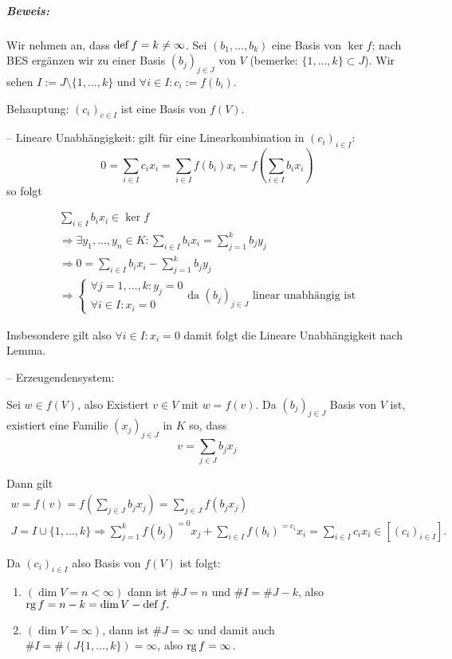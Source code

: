 \subparagraph{Beweis: }
	Wir nehmen an, dass $ \operatorname{def} f = k \neq \infty $.
	Sei $ (b_1,...,b_k) $ eine Basis von $ \ker f $;
	nach BES ergänzen wir zu einer Basis $ (b_j)_{j\in J} $ von $ V $ (bemerke: $ \{1,...,k\}\subset J $).
	Wir sehen $ I:= J\setminus \{1,...,k\} $ und $ \forall i\in I: c_i := f(b_i) $.
	
	Behauptung: $(c_i)_{c\in I}$ ist eine Basis von $f(V)$.
	
	-- Lineare Unabhängigkeit: gilt für eine Linearkombination in $(c_i)_{i\in I}$:
	\begin{equation*}
		0=\sum_{i\in I}c_ix_i = \sum_{i\in I}f(b_i)x_i = f(\sum_{i\in I}b_ix_i)
	\end{equation*}
	so folgt
	
	\begin{gather*}
		\sum_{i\in I}b_ix_i \in \ker f\\
		\Rightarrow \exists y_1,...,y_n\in K:\sum_{i\in I}b_ix_i=\sum_{j=1}^{k}b_jy_j\\
		\Rightarrow 0 = \sum_{i\in I}b_ix_i - \sum_{j=1}^{k}b_jy_j\\
		\Rightarrow
		\begin{cases}
			\forall j = 1, ... ,k:y_j=0\\
			\forall i\in I: x_i = 0
		\end{cases}
		\text{da $(b_j)_{j\in J}$ linear unabhängig ist}
	\end{gather*}
			
	Insbesondere gilt also $\forall i\in I: x_i = 0$ damit folgt die Lineare Unabhängigkeit nach Lemma.
	
	-- Erzeugendensystem:
	
	Sei $w\in f(V)$, also Existiert $v\in V$ mit $w = f(v)$. Da $(b_j)_{j\in J}$ Basis von $V$ ist, existiert eine Familie $(x_j)_{j\in J}$ in $K$ so, dass 
	\begin{equation*}
		v = \sum_{j\in J} b_jx_j
	\end{equation*}
	
	Dann gilt
	\begin{gather*}
		w = f(v) = f(\sum_{j\in J} b_jx_j) = \sum_{j\in J}f(b_jx_j)\\
		J=I \cup\{{1,...,k\}} \Rightarrow \sum_{j=1}^{k}f(b_j)^{=0}x_j + \sum_{i\in I}f(b_i)^{=c_i}x_i = \sum_{i\in I}c_ix_i\in[(c_i)_{i\in I}].
	\end{gather*}
			
	Da $(c_i)_{i\in I}$ also Basis von $f(V)$ ist folgt:
			
	\begin{enumerate}[1.{ Fall}]
		\item $(\dim V = n<\infty)$ dann ist $\# J = n$ und $\# I = \# J-k$, also $\operatorname{rg} f = n-k = \dim V - \operatorname{def} f.$\\
		\item $(\dim V = \infty)$, dann ist $\# J = \infty $ und damit auch $\#I =\#(J\{{1,...,k\}})=\infty $, also $\operatorname{rg} f= \infty$.
	\end{enumerate}
	
